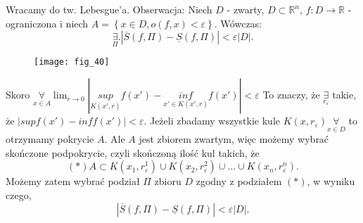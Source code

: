 \documentclass[../main.tex]{subfiles}
\begin{document}
    Wracamy do tw. Lebesgue'a.
    Obserwacja: Niech $D$ - zwarty, $D\subset \mathbb{R}^n$, $f: D\to \mathbb{R}$ - ograniczona i niech $A = \left\{ x\in D, o(f,x) < \varepsilon \right\} $. Wówczas:
    \[
        \underset{\Pi}{\exists} . |\overline{S}(f,\Pi) - \underline{S}(f,\Pi)|<\varepsilon |D|
    .\]
    \begin{figure}[h]
        \centering
        \texttt{[image: fig\_40]}
    \end{figure}
    \begin{dowod}
        Skoro $\underset{x\in A}{\forall} \lim_{r\to 0} | \underset{K(x',r)}{sup} f(x') - \underset{x'\in K(x',r)}{inf} f(x') | < \varepsilon$
        To znaczy, że
        $\underset{r_\varepsilon}{\exists} $ takie, że $|sup f(x') - inf f(x') | < \varepsilon$.
        Jeżeli zbadamy wszystkie kule $K(x,r_\varepsilon) \underset{x\in D}{\forall} $ to otrzymamy pokrycie $A$. Ale $A$ jest zbiorem zwartym, więc możemy wybrać skończone podpokrycie, czyli skończoną ilość kul takich, że
        \[(*)
            A \subset K(x_1,r_\varepsilon^1)\cup K(x_2,r_\varepsilon^2)\cup\ldots\cup K(x_n,r_\varepsilon^n)
        .\]
        Możemy zatem wybrać podział $\Pi$ zbioru $D$ zgodny z podziałem $(*)$, w wyniku czego,
        \[
            |\overline{S}(f,\Pi) - \underline{S}(f,\Pi)|<\varepsilon |D|
        .\]
    \end{dowod}
\end{document}
